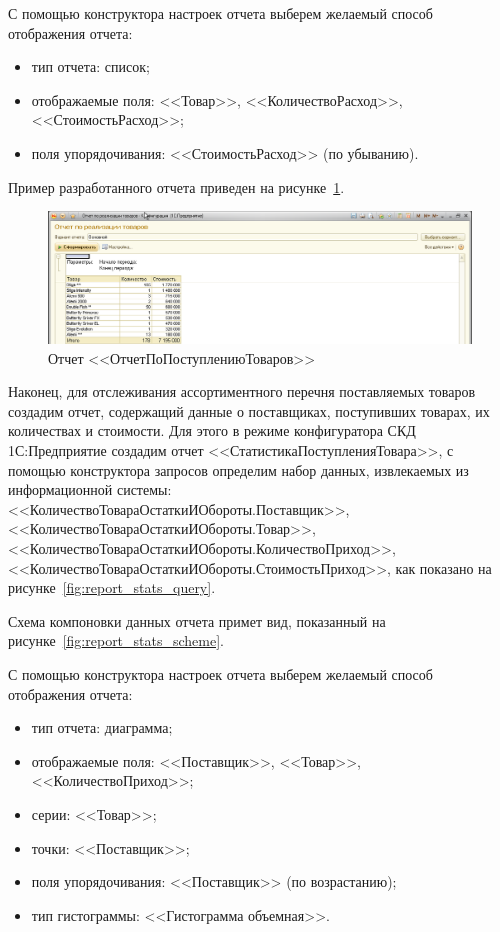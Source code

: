 С помощью конструктора настроек отчета выберем желаемый способ отображения
отчета:
\begin{itemize}
\item тип отчета: список;
\item отображаемые поля: <<Товар>>,
  <<КоличествоРасход>>, <<СтоимостьРасход>>;
\item поля упорядочивания:
  <<СтоимостьРасход>> (по убыванию).
\end{itemize}

Пример разработанного отчета приведен на рисунке~\ref{fig:report_output}.

\begin{figure}[h!]
  \centering
  \includegraphics[width=150mm]{pic/report_output}
  \caption{Отчет <<ОтчетПоПоступлениюТоваров>>}
  \label{fig:report_output}
\end{figure}

Наконец, для отслеживания ассортиментного перечня поставляемых товаров
создадим отчет, содержащий данные о поставщиках,
поступивших товарах, их количествах и стоимости.
Для этого в режиме конфигуратора СКД 1С:Предприятие создадим отчет
<<СтатистикаПоступленияТовара>>, с помощью конструктора запросов
определим набор данных, извлекаемых из информационной системы:
<<КоличествоТовараОстаткиИОбороты.Поставщик>>,
<<КоличествоТовараОстаткиИОбороты.Товар>>,
<<КоличествоТовараОстаткиИОбороты.КоличествоПриход>>,
<<КоличествоТовараОстаткиИОбороты.СтоимостьПриход>>,
как показано на рисунке~\ref{fig:report_stats_query}.

Схема компоновки данных отчета примет вид,
показанный на рисунке~\ref{fig:report_stats_scheme}.

С помощью конструктора настроек отчета выберем желаемый способ отображения
отчета:
\begin{itemize}
\item тип отчета: диаграмма;
\item отображаемые поля: <<Поставщик>>,
  <<Товар>>, <<КоличествоПриход>>;
\item серии: <<Товар>>;
\item точки: <<Поставщик>>;
\item поля упорядочивания:
  <<Поставщик>> (по возрастанию);
\item тип гистограммы:
  <<Гистограмма объемная>>.
\end{itemize}

